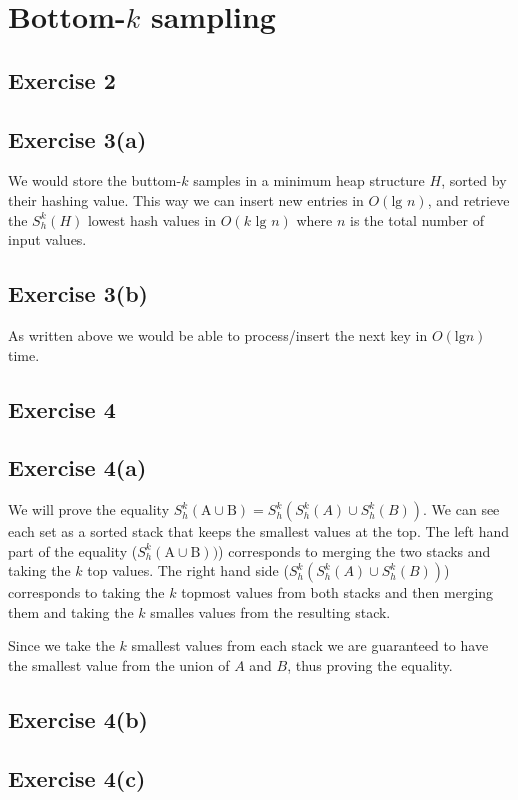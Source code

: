 \section{Bottom-$k$ sampling}

\subsection{Exercise 2}

\subsection{Exercise 3(a)}
We would store the buttom-$k$ samples in a minimum heap structure $H$, sorted by
their hashing value. This way we can insert new entries in $O(\text{lg } n)$,
and retrieve the $S^{k}_{h}(H)$ lowest hash values in $O(k \text{ lg } n)$ where
$n$ is the total number of input values.

\subsection{Exercise 3(b)}
As written above we would be able to process/insert the next key in $O(\text{lg
} n)$ time.


\subsection{Exercise 4}
\subsection{Exercise 4(a)}
We will prove the equality $S^{k}_{h}(\text{A} \cup \text{B}) =
S^{k}_{h}(S^{k}_{h}(A) \cup S^{k}_{h}(B))$.
%
We can see each set as a sorted stack that keeps the smallest values at the
top. The left hand part of the equality ($S^{k}_{h}(\text{A} \cup \text{B}))$)
corresponds to merging the two stacks and taking the $k$ top values.
%
The right hand side ($S^{k}_{h}(S^{k}_{h}(A) \cup S^{k}_{h}(B))$) corresponds to
taking the $k$ topmost values from both stacks and then merging them and taking
the $k$ smalles values from the resulting stack.

Since we take the $k$ smallest values from each stack we are guaranteed to have
the smallest value from the union of $A$ and $B$, thus proving the equality.

\subsection{Exercise 4(b)}


\subsection{Exercise 4(c)}